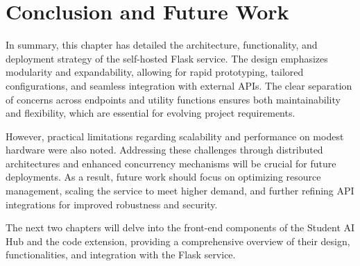 \section{Conclusion and Future Work}

In summary, this chapter has detailed the architecture, functionality, and deployment strategy of the self-hosted Flask service. 
The design emphasizes modularity and expandability, allowing for rapid prototyping, tailored configurations, and seamless integration with external APIs. 
The clear separation of concerns across endpoints and utility functions ensures both maintainability and flexibility, which are essential for evolving project requirements.

However, practical limitations regarding scalability and performance on modest hardware were also noted. 
Addressing these challenges through distributed architectures and enhanced concurrency mechanisms will be crucial for future deployments. 
As a result, future work should focus on optimizing resource management, scaling the service to meet higher demand, and further refining API integrations for improved robustness and security.

The next two chapters will delve into the front-end components of the Student AI Hub and the code extension, providing a comprehensive overview of their design, functionalities, and integration with the Flask service.



